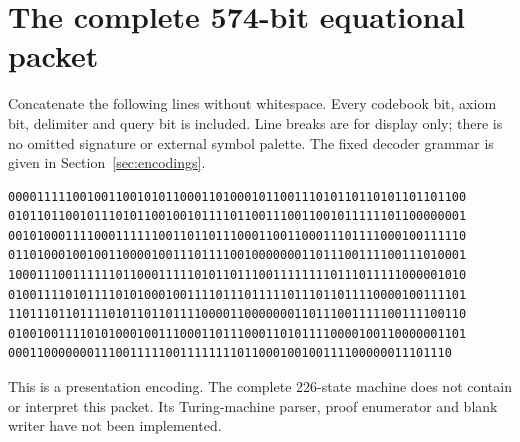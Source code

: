 \section{The complete 574-bit equational packet}
Concatenate the following lines without whitespace. Every codebook
bit, axiom bit, delimiter and query bit is included. Line breaks
are for display only; there is no omitted signature or external
symbol palette. The fixed decoder grammar is given in
Section~\ref{sec:encodings}.
\begin{lstlisting}
0000111110010011001010110001101000101100111010110110101101101100
0101101100101110101100100101111011001110011001011111101100000001
0010100011110001111110011011011100011001100011101111000100111110
0110100010010011000010011101111001000000011011100111100111010001
1000111001111110110001111101011011100111111110111011111000001010
0100111101011110101000100111101110111110111011011110000100111101
1101110110111101011011011110000110000000110111001111100111100110
0100100111101010001001110001101110001101011110000100110000001101
00011000000011100111110011111111011000100100111100000011101110
\end{lstlisting}
This is a presentation encoding. The complete 226-state machine
does not contain or interpret this packet. Its Turing-machine
parser, proof enumerator and blank writer have not been implemented.
